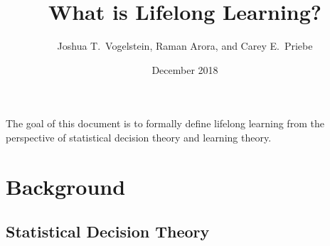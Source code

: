 \documentclass{article}
\title{What is Lifelong Learning?}
\author{Joshua T.~Vogelstein, Raman Arora, and Carey E.~Priebe}
\affil{Johns Hopkins University}
\date{December 2018}
\begin{document}
\maketitle

The goal of this document is to formally define lifelong learning from the perspective of statistical decision theory and learning theory.    

\setcounter{tocdepth}{1}
\tableofcontents

\clearpage
\setcounter{section}{-1}
\section{Background}
\subsection{Statistical Decision Theory}
\end{document}
